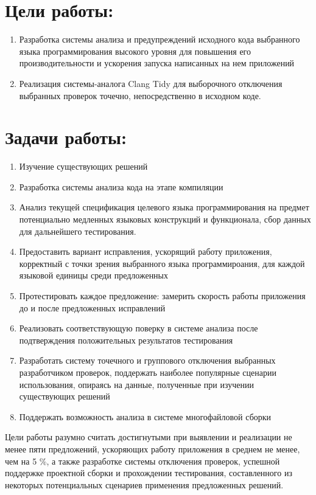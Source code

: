 \documentclass{mipt-thesis-bs}
\begin{document}
\section{Цели работы:}

\begin{enumerate}
    \item Разработка системы анализа и предупреждений исходного кода выбранного языка программирования высокого уровня 
для повышения его производительности и ускорения запуска написанных на нем приложений
    \item Реализация системы-аналога Clang Tidy для выборочного отключения выбранных проверок точечно, непосредственно в исходном коде.
\end{enumerate}

\section{Задачи работы:}

\begin{enumerate}
    \item Изучение существующих решений
    \item Разработка системы анализа кода на этапе компиляции
    \item Анализ текущей спецификация целевого языка программирования на предмет потенциально медленных языковых конструкций и функционала, 
    сбор данных для дальнейшего тестирования.
    \item Предоставить вариант исправления, ускорящий работу приложения, корректный с точки 
    зрения выбранного языка программироания, для каждой языковой единицы среди предложенных
    \item Протестировать каждое предложение: замерить скорость работы приложения до и после предложенных исправлений
    \item Реализовать соответствующую поверку в системе анализа после подтверждения положительных результатов тестирования
    \item Разработать систему точечного и группового отключения выбранных разработчиком проверок, поддержать наиболее популярные сценарии 
    использования, опираясь на данные, полученные при изучении существующих решений
    \item Поддержать возможность анализа в системе многофайловой сборки

\end{enumerate}

Цели работы разумно считать достигнутыми при выявлении и реализации не менее пяти предложений, ускоряющих работу приложения в среднем не менее, чем на 5 \%, 
а также разработке системы отключения проверок, успешной поддержке проектной сборки и прохождении тестирования, составленного из некоторых 
потенциальных сценариев применения предложенных решений.
\end{document}
